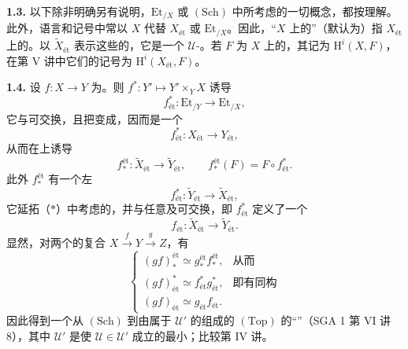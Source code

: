 \textbf{1.3.} 以下除非明确另有说明，$\mathrm{Et}_{/X}$ 或 $(\mathrm{Sch})$ 中所考虑的一切概念，都按理解。此外，语言和记号中常以 $X$ 代替 $X_{\text{ét}}$ 或 $\mathrm{Et}_{/X}$。因此，“$X$ 上的”（默认为）指 $X_{\text{ét}}$ 上的。以 $\widetilde X_{\text{ét}}$ 表示这些的，它是一个 $\mathcal U$-。若 $F$ 为 $X$ 上的，其记为 $\mathrm H^i(X,F)$，在第 V 讲中它们的记号为 $\mathrm H^i(X_{\text{ét}},F)$。

\textbf{1.4.} 设 $f:X\to Y$ 为。则 $f^*:Y'\mapsto Y'\times_YX$ 诱导
\[
 f_{\text{ét}}^*:\mathrm{Et}_{/Y}\longrightarrow\mathrm{Et}_{/X},\tag{*}
\]
它与可交换，且把变成，因而是一个
\[
 f_{\text{ét}}^*:X_{\text{ét}}\longrightarrow Y_{\text{ét}},
\]
从而在上诱导
\[
 f_*^{\text{ét}}:\widetilde X_{\text{ét}}\longrightarrow\widetilde Y_{\text{ét}},
 \qquad f_*^{\text{ét}}(F)=F\circ f_{\text{ét}}^*.
\]
此外 $f_*^{\text{ét}}$ 有一个左
\[
 f_{\text{ét}}^*:\widetilde Y_{\text{ét}}\longrightarrow\widetilde X_{\text{ét}},
\]
它延拓（$*$）中考虑的，并与任意及可交换，即 $f_{\text{ét}}^*$ 定义了一个
\[
 f_{\text{ét}}:\widetilde X_{\text{ét}}\longrightarrow\widetilde Y_{\text{ét}}.
\]
显然，对两个的复合 $X\xrightarrow fY\xrightarrow gZ$，有
\[
 \begin{cases}
 (gf)_*^{\text{ét}}\simeq g_*^{\text{ét}}f_*^{\text{ét}},&\text{从而}\\
 (gf)_{\text{ét}}^*\simeq f_{\text{ét}}^*g_{\text{ét}}^*,&\text{即有同构}\\
 (gf)_{\text{ét}}\simeq g_{\text{ét}}f_{\text{ét}}.
 \end{cases}
\]
因此得到一个从 $(\mathrm{Sch})$ 到由属于 $\mathcal U'$ 的组成的 $(\mathrm{Top})$ 的“”（SGA 1 第 VI 讲 8），其中 $\mathcal U'$ 是使 $\mathcal U\in\mathcal U'$ 成立的最小；比较第 IV 讲。

